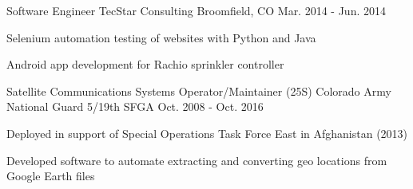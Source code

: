 \begin{cventries}
  \cventry
    {Software Engineer} %
    {TecStar Consulting} %
    {Broomfield, CO} %
    {Mar. 2014 - Jun. 2014} %
    {
      \begin{cvitems} %
        \item {Selenium automation testing of websites with Python and Java}
        \item {Android app development for Rachio sprinkler controller}
      \end{cvitems}
    }

  \cventry
    {Satellite Communications Systems Operator/Maintainer (25S)} %
    {Colorado Army National Guard} %
    {5/19th SFGA} %
    {Oct. 2008 - Oct. 2016} %
    {
      \begin{cvitems} %
        \item {Deployed in support of Special Operations Task Force East in Afghanistan (2013)}
        \item {Developed software to automate extracting and converting geo locations from Google Earth files}
      \end{cvitems}
    }
    
\end{cventries}
